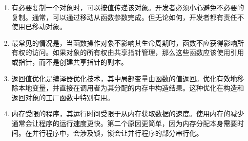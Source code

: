 \begin{enumerate}
\item 
有必要复制一个对象时，可以按值传递该对象。开发者必须小心避免不必要的复制。通常，可以通过移动从函数参数完成。但无论如何，开发者都有责任不使用已移动对象。

\item 
最常见的情况是，当函数操作对象不影响其生命周期时，函数不应获得影响所有权的访问。如果对象的所有权由共享指针管理，那么这些函数应该使用引用或指针，而不是创建共享指针的副本。

\item 
返回值优化是编译器优化技术，其中局部变量由函数的值返回。优化有效地移除本地变量，并直接在调用者为其分配的内存中构造结果。这种优化在构造和返回对象的工厂函数中特别有用。

\item
内存受限的程序，其运行时间受限于从内存获取数据的速度。使用内存的减少通常会让程序的运行速度更快。第二个原因更简单，因为内存分配本身需要时间。在并行程序中，会涉及锁，锁会让并行程序的部分串行化。

\end{enumerate}